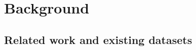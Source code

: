 \section{Background}\label{SecD:background}

%
%
%




\subsection{Related work and existing datasets}

